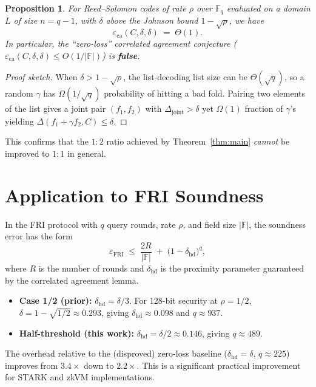 \documentclass[11pt]{article}
\newtheorem{proposition}[theorem]{Proposition}
\newcommand{\FF}{\mathbb{F}}
\newcommand{\ca}{\varepsilon_{\mathrm{ca}}}
\newcommand{\dist}{\Delta}
\begin{document}
\begin{proposition}\label{prop:tight}
For Reed--Solomon codes of rate $\rho$ over $\FF_q$ evaluated on a
domain $L$ of size $n = q - 1$, with $\delta$ above the Johnson bound
$1 - \sqrt{\rho}$, we have
\[
  \ca(C, \delta, \delta) \;=\; \Theta(1).
\]
In particular, the ``zero-loss'' correlated agreement conjecture
($\ca(C, \delta, \delta) \le O(1/|\FF|)$) is \textbf{false}.
\end{proposition}

\begin{proof}[Proof sketch]
When $\delta > 1 - \sqrt{\rho}$, the list-decoding list size can be
$\Theta(\sqrt{q})$, so a random $\gamma$ has $\Omega(1/\sqrt{q})$
probability of hitting a bad fold.  Pairing two elements of the list
gives a joint pair $(f_1, f_2)$ with $\dist_{\mathrm{joint}} > \delta$
yet $\Omega(1)$ fraction of $\gamma$'s yielding $\dist(f_1 + \gamma
f_2, C) \le \delta$.
\end{proof}

This confirms that the $1{:}2$ ratio achieved by
Theorem~\ref{thm:main} \emph{cannot} be improved to $1{:}1$ in general.

\section{Application to FRI Soundness}

In the FRI protocol with $q$ query rounds, rate $\rho$, and field size
$|\FF|$, the soundness error has the form
\[
  \varepsilon_{\mathrm{FRI}}
  \;\le\;
  \frac{2R}{|\FF|}
  \;+\;
  \bigl(1 - \delta_{\mathrm{hd}}\bigr)^q,
\]
where $R$ is the number of rounds and $\delta_{\mathrm{hd}}$ is the
proximity parameter guaranteed by the correlated agreement lemma.

\begin{itemize}
\item \textbf{Case 1/2 (prior):}\;
  $\delta_{\mathrm{hd}} = \delta/3$.  For 128-bit security at
  $\rho = 1/2$, $\delta = 1 - \sqrt{1/2} \approx 0.293$, giving
  $\delta_{\mathrm{hd}} \approx 0.098$ and $q \approx 937$.

\item \textbf{Half-threshold (this work):}\;
  $\delta_{\mathrm{hd}} = \delta/2 \approx 0.146$, giving
  $q \approx 489$.
\end{itemize}

The overhead relative to the (disproved) zero-loss baseline
($\delta_{\mathrm{hd}} = \delta$, $q \approx 225$) improves from
$3.4\times$ down to $2.2\times$.  This is a significant practical
improvement for STARK and zkVM implementations.
\end{document}
